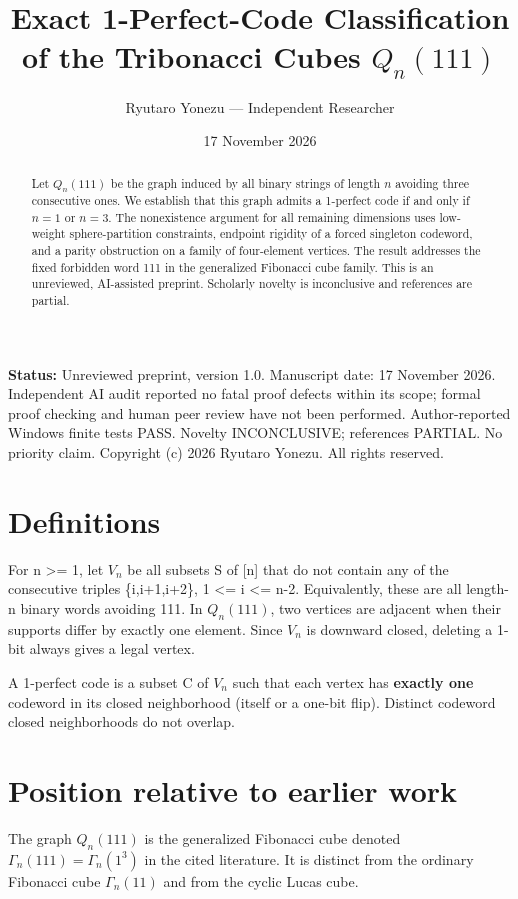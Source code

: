 \documentclass[
  11pt,
]{article}
\title{Exact 1-Perfect-Code Classification of the Tribonacci Cubes
\(Q_n(111)\)}
\author{Ryutaro Yonezu --- Independent Researcher}
\date{17 November 2026}
\begin{document}
\maketitle
\begin{abstract}
Let \(Q_n(111)\) be the graph induced by all binary strings of length
\(n\) avoiding three consecutive ones. We establish that this graph
admits a 1-perfect code if and only if \(n=1\) or \(n=3\). The
nonexistence argument for all remaining dimensions uses low-weight
sphere-partition constraints, endpoint rigidity of a forced singleton
codeword, and a parity obstruction on a family of four-element vertices.
The result addresses the fixed forbidden word 111 in the generalized
Fibonacci cube family. This is an unreviewed, AI-assisted preprint. Scholarly novelty is inconclusive and references are partial.
\end{abstract}

\textbf{Status:} Unreviewed preprint, version 1.0. Manuscript date: 17 November 2026.
Independent AI audit reported no fatal proof defects within its scope;
formal proof checking and human peer review have not been performed.
Author-reported Windows finite tests PASS. Novelty INCONCLUSIVE;
references PARTIAL. No priority claim. Copyright (c) 2026 Ryutaro
Yonezu. All rights reserved.

\section{Definitions}\label{definitions}

For n \textgreater= 1, let \(V_n\) be all subsets S of {[}n{]} that do
not contain any of the consecutive triples \{i,i+1,i+2\}, 1 \textless= i
\textless= n-2. Equivalently, these are all length-n binary words
avoiding 111. In \(Q_n(111)\), two vertices are adjacent when their
supports differ by exactly one element. Since \(V_n\) is downward
closed, deleting a 1-bit always gives a legal vertex.

A 1-perfect code is a subset C of \(V_n\) such that each vertex has
\textbf{exactly one} codeword in its closed neighborhood (itself or a
one-bit flip). Distinct codeword closed neighborhoods do not overlap.

\section{Position relative to earlier
work}\label{position-relative-to-earlier-work}

The graph \(Q_n(111)\) is the generalized Fibonacci cube denoted
\(\Gamma_n(111)=\Gamma_n(1^3)\) in the cited literature. It is distinct
from the ordinary Fibonacci cube \(\Gamma_n(11)\) and from the cyclic
Lucas cube.
\end{document}
